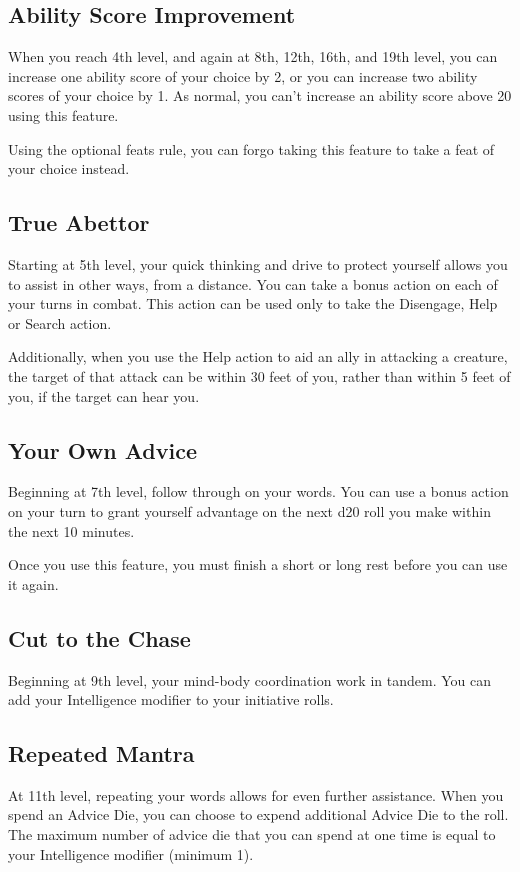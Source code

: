 \documentclass[letterpaper,openany,twoside,twocolumn]{book}
\begin{document}
	\subsection*{Ability Score Improvement}
	When you reach 4th level, and again at 8th, 12th, 16th, and 19th level, you can increase one ability score of your choice by 2, or you can increase two ability scores of your choice by 1. As normal, you can’t increase an ability score above 20 using this feature.
	
	Using the optional feats rule, you can forgo taking this feature to take a feat of your choice instead.
	
	\subsection*{True Abettor}
	Starting at 5th level, your quick thinking and drive to protect yourself allows you to assist in other ways, from a distance. You can take a bonus action on each of your turns in combat. This action can be used only to take the Disengage, Help or Search action.
	
	Additionally, when you use the Help action to aid an ally in attacking a creature, the target of that attack can be within 30 feet of you, rather than within 5 feet of you, if the target can hear you.
	
	\subsection*{Your Own Advice}
	Beginning at 7th level, follow through on your words. You can use a bonus action on your turn to grant yourself advantage on the next d20 roll you make within the next 10 minutes.
	
	Once you use this feature, you must finish a short or long rest before you can use it again.
	
	\subsection*{Cut to the Chase}
	Beginning at 9th level, your mind-body coordination work in tandem. You can add your Intelligence modifier to your initiative rolls.
	
	\subsection*{Repeated Mantra}
	At 11th level, repeating your words allows for even further assistance. When you spend an Advice Die, you can choose to expend additional Advice Die to the roll. The maximum number of advice die that you can spend at one time is equal to your Intelligence modifier (minimum 1).
	
\end{document}
